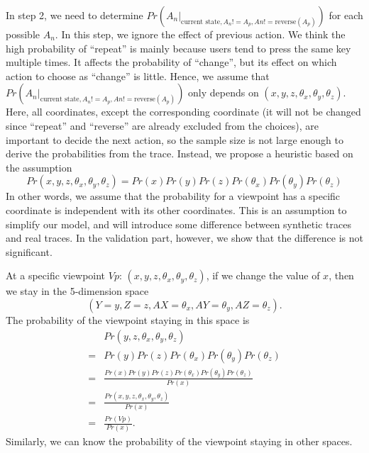 In step 2, we need to determine $Pr(A_n |_{\textrm{current state}, A_n != A_p, An != \textrm{reverse}(A_p)})$
for each possible $A_n$. In this step, we ignore the effect of previous action. 
We think the high probability of ``repeat'' is mainly because users tend to press the same key multiple times. 
It affects the probability of ``change'', but its effect on which action to choose as ``change'' is little.
Hence, we assume that $Pr(A_n |_{\textrm{current state}, A_n != A_p, An != \textrm{reverse}(A_p)})$
only depends on $(x, y, z, \theta_x, \theta_y, \theta_z)$. Here, all coordinates, except the corresponding coordinate
(it will not be changed since ``repeat'' and ``reverse'' are already excluded from the choices),
are important to decide the next action, so the sample size is not large enough to derive the probabilities
from the trace.
Instead, we propose a heuristic based on the assumption
\[
    Pr(x, y, z, \theta_x, \theta_y, \theta_z) = Pr(x)Pr(y)Pr(z)Pr(\theta_x)Pr(\theta_y)Pr(\theta_z)
\]
In other words, we assume that the probability for a viewpoint has a specific coordinate is independent with its 
other coordinates. This is an assumption to simplify our model, and will introduce some difference between
synthetic traces and real traces. In the validation part, however, we show that the difference is not 
significant.

At a specific viewpoint $Vp$: $(x, y, z, \theta_x, \theta_y, \theta_z)$, if we change the value of $x$, 
then we stay in the 5-dimension space
\[
    (Y=y, Z=z, AX=\theta_x, AY=\theta_y, AZ=\theta_z).
\]
The probability of the viewpoint staying in this space is 
\begin{align*}
    &Pr(y, z, \theta_x, \theta_y, \theta_z)\\
    =&Pr(y)Pr(z)Pr(\theta_x)Pr(\theta_y)Pr(\theta_z)\\
    =&\frac{Pr(x)Pr(y)Pr(z)Pr(\theta_x)Pr(\theta_y)Pr(\theta_z)}{Pr(x)}\\
    =&\frac{Pr(x, y, z, \theta_x, \theta_y, \theta_z)}{Pr(x)}\\
    =&\frac{Pr(Vp)}{Pr(x)}.
\end{align*}
Similarly, we can know the probability of the viewpoint staying in other spaces. 

